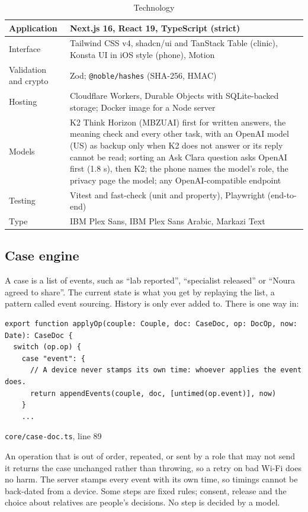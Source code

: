 \documentclass[10.5pt,a4paper]{article}
\newcommand{\toprl}{\arrayrulecolor{ink}\toprule\arrayrulecolor{rule}}
\newcommand{\code}[1]{\texttt{\small #1}}
\begin{document}
{\small
\begin{xltabular}{\textwidth}{@{}P{3.6cm}L@{}}
\caption{Technology}\\
\toprl
Application & Next.js 16, React 19, TypeScript (strict)\\
\midrule
Interface & Tailwind CSS v4, shadcn/ui and TanStack Table (clinic), Konsta UI in iOS style (phone), Motion\\
\midrule
Validation and crypto & Zod; \code{@noble/hashes} (SHA-256, HMAC)\\
\midrule
Hosting & Cloudflare Workers, Durable Objects with SQLite-backed storage; Docker image for a Node server\\
\midrule
Models & K2 Think Horizon (MBZUAI) first for written answers, the meaning check and every other task, with an OpenAI model (US) as backup only when K2 does not answer or its reply cannot be read; sorting an Ask Clara question asks OpenAI first (1.8 s), then K2; the phone names the model's role, the privacy page the model; any OpenAI-compatible endpoint\\
\midrule
Testing & Vitest and fast-check (unit and property), Playwright (end-to-end)\\
\midrule
Type & IBM Plex Sans, IBM Plex Sans Arabic, Markazi Text\\
\bottomrule
\end{xltabular}}

\subsection{Case engine}

A case is a list of events, such as ``lab reported'', ``specialist released'' or ``Noura agreed to share''. The current
state is what you get by replaying the list, a pattern called event sourcing. History is only ever added to. There is
one way in:

\begin{Verbatim}
export function applyOp(couple: Couple, doc: CaseDoc, op: DocOp, now: Date): CaseDoc {
  switch (op.op) {
    case "event": {
      // A device never stamps its own time: whoever applies the event does.
      return appendEvents(couple, doc, [untimed(op.event)], now)
    }
    ...
\end{Verbatim}
{\footnotesize\color{muted}\code{core/case-doc.ts}, line 89}

An operation that is out of order, repeated, or sent by a role that may not send it returns the case unchanged rather
than throwing, so a retry on bad Wi-Fi does no harm. The server stamps every event with its own time, so timings
cannot be back-dated from a device. Some steps are fixed rules; consent, release and the choice about relatives are
people's decisions. No step is decided by a model.
\end{document}
